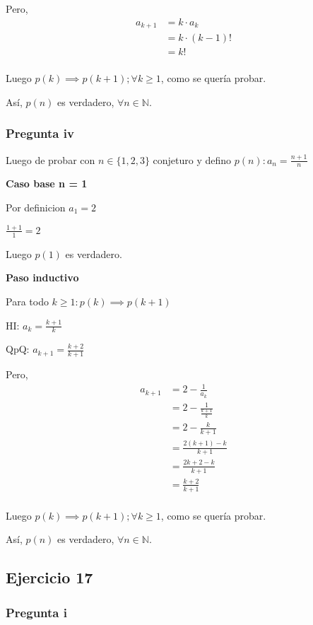 Pero,
\begin{align*}
    a_{k+1} &= k\cdot a_k \\
    &= k\cdot (k-1)! \\
    &= k! \\
\end{align*}

Luego $p(k) \implies p(k+1); \forall k \geq 1$, como se quería probar.

Así, $p(n)$ es verdadero, $\forall n \in \mathbb{N}$.

\subsubsection{Pregunta iv}

Luego de probar con $ n \in \{ 1,2,3 \} $ conjeturo y defino $ p(n): a_n = \frac{n+1}{n} $

\textbf{Caso base n = 1}

Por definicion $ a_1 = 2$

$ \frac{1+1}{1} = 2 $

Luego $ p(1) $ es verdadero.

\textbf{Paso inductivo}

Para todo $k \geq 1: p(k) \implies p(k+1)$

HI: $ a_k = \frac{k+1}{k}$

QpQ: $ a_{k+1} = \frac{k+2}{k+1}$

Pero,
\begin{align*}
    a_{k+1} &= 2-\frac{1}{a_k} \\ 
    &= 2-\frac{1}{\frac{k+1}{k}} \\ 
    &= 2-\frac{k}{k+1} \\
    &= \frac{2(k+1)-k}{k+1} \\
    &= \frac{2k+2-k}{k+1} \\
    &= \frac{k+2}{k+1} \\
\end{align*}

Luego $p(k) \implies p(k+1); \forall k \geq 1$, como se quería probar.

Así, $p(n)$ es verdadero, $\forall n \in \mathbb{N}$.

\subsection{Ejercicio 17}

\subsubsection{Pregunta i}

